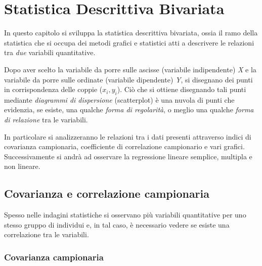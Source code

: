 {}



\chapter{Statistica Descrittiva Bivariata}\label{cap4}

In questo capitolo si sviluppa la statistica descrittiva bivariata, ossia il ramo della statistica che si occupa dei metodi grafici e statistici atti a descrivere le relazioni tra \textit{due} variabili quantitative.

Dopo aver scelto la variabile da porre sulle ascisse (variabile indipendente) \textit{X} e la variabile da porre sulle ordinate (variabile dipendente) \textit{Y}, si disegnano dei punti in corrispondenza delle coppie ($x_i, y_i$). Ciò che si ottiene disegnando tali punti mediante \textit{diagrammi di dispersione} (scatterplot) è una nuvola di punti che evidenzia, se esiste, una qualche \textit{forma di regolarità}, o meglio una qualche \textit{forma di relazione} tra le variabili.

In particolare si analizzeranno le relazioni tra i dati presenti attraverso indici di covarianza campionaria, coefficiente di correlazione campionario e vari grafici. Successivamente si andrà ad osservare la regressione lineare semplice, multipla e non lineare.

\section{Covarianza e correlazione campionaria}\label{cap4.1}

Spesso nelle indagini statistiche si osservano più variabili quantitative per uno stesso gruppo di individui e, in tal caso, è necessario vedere se esiste una correlazione tra le variabili.

\subsection{Covarianza campionaria}\label{cap4.1.1}

